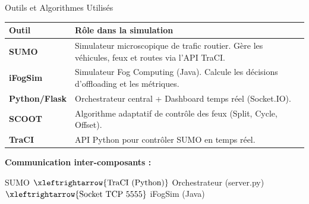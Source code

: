 \documentclass[10pt,aspectratio=169]{beamer}
\begin{document}
\begin{frame}{Outils et Algorithmes Utilis\'es}
\begin{table}
\centering
\begin{tabular}{lp{8cm}}
\toprule
\textbf{Outil} & \textbf{R\^ole dans la simulation} \\
\midrule
\textbf{SUMO} & Simulateur microscopique de trafic routier. G\`ere les v\'ehicules, feux et routes via l'API TraCI. \\
\textbf{iFogSim} & Simulateur Fog Computing (Java). Calcule les d\'ecisions d'offloading et les m\'etriques. \\
\textbf{Python/Flask} & Orchestrateur central + Dashboard temps r\'eel (Socket.IO). \\
\textbf{SCOOT} & Algorithme adaptatif de contr\^ole des feux (Split, Cycle, Offset). \\
\textbf{TraCI} & API Python pour contr\^oler SUMO en temps r\'eel. \\
\bottomrule
\end{tabular}
\end{table}

\vspace{0.2cm}
\textbf{Communication inter-composants :}
\begin{center}
\footnotesize
SUMO $\xleftrightarrow{\text{TraCI (Python)}}$ Orchestrateur (server.py) $\xleftrightarrow{\text{Socket TCP 5555}}$ iFogSim (Java)
\end{center}
\end{frame}
\end{document}

